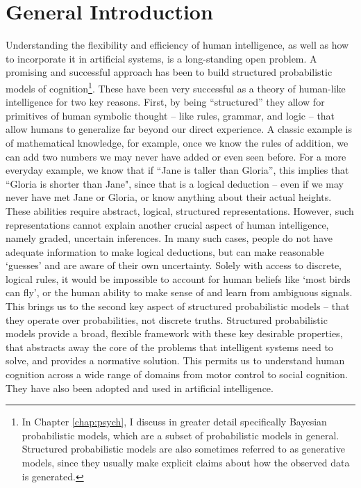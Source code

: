\chapter{General Introduction}
\label{chap:intro}

Understanding the flexibility and efficiency of human intelligence, as well as how to incorporate it in artificial systems, is a long-standing open problem. A promising and successful approach has been to build structured probabilistic models of cognition\footnote{In Chapter \ref{chap:psych}, I discuss in greater detail specifically Bayesian probabilistic models, which are a subset of probabilistic models in general. Structured probabilistic models are also sometimes referred to as generative models, since they usually make explicit claims about how the observed data is generated.}. These have been very successful as a theory of human-like intelligence for two key reasons. First, by being ``structured'' they allow for primitives of human symbolic thought -- like rules, grammar, and logic -- that allow humans to generalize far beyond our direct experience. \cite{fodor88, chomsky2002syntactic} A classic example is of mathematical knowledge, for example, once we know the rules of addition, we can add two numbers we may never have added or even seen before. For a more everyday example, we know that if ``Jane is taller than Gloria'', this implies that ``Gloria is shorter than Jane", since that is a logical deduction -- even if we may never have met Jane or Gloria, or know anything about their actual heights. These abilities require abstract, logical, structured representations. However, such representations cannot explain another crucial aspect of human intelligence, namely graded, uncertain inferences.\cite{rogers2004semantic} In many such cases, people do not have adequate information to make logical deductions, but can make reasonable `guesses' and are aware of their own uncertainty. Solely with access to discrete, logical rules, it would be impossible to account for human beliefs like `most birds can fly', or the human ability to make sense of and learn from ambiguous signals. This brings us to the second key aspect of structured probabilistic models -- that they operate over probabilities, not discrete truths. Structured probabilistic models provide a broad, flexible framework with these key desirable properties, that abstracts away the core of the problems that intelligent systems need to solve, and provides a normative solution. This permits us to understand human cognition across a wide range of domains\citep{griffiths2008bayesian} from motor control\citep{kording2006bayesian} to social cognition\citep{baker2007goal}. They have also been adopted and used in artificial intelligence\cite{lake2015human, del2013understanding, zhao2011image, steyvers2007probabilistic}.

